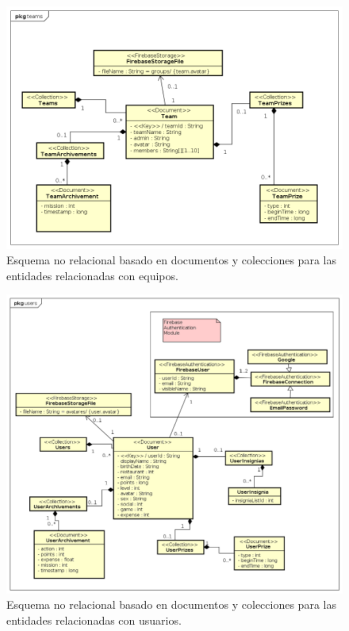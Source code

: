 \documentclass[twoside]{report}
\begin{document}
\begin{figure}[H]
\centering
\includegraphics[scale=0.5]{images/databaseNRteams}
\caption{Esquema no relacional basado en documentos y colecciones para las entidades relacionadas con equipos.}
\label{nrteams}
\end{figure}

\begin{figure}[H]
\centering
\includegraphics[scale=0.5]{images/databaseNRusers}
\caption{Esquema no relacional basado en documentos y colecciones para las entidades relacionadas con usuarios.}
\label{nrusers}
\end{figure}
\end{document}
